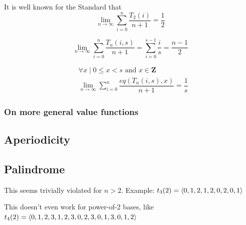 \documentclass[conference]{IEEEtran}
\begin{document}
It is well known \cite{Cai_2020} for the Standard \TMS that
\begin{equation}
    \lim_{n\to\infty} \sum_{i=0}^n \dfrac{T_{2}(i)}{n+1} = \dfrac{1}{2}
\end{equation}


\begin{equation}
    \lim_{n\to\infty} \sum_{i=0}^n\dfrac{T_{n}(i, s)}{n+1} = \sum_{i=0}^{s-1}\dfrac{i}{s} = \dfrac{n-1}{2}
\end{equation}


\begin{equation}
\begin{aligned}
    &\forall{x} \;|\; 0 \le x < s \text{ and } x \in \mathbf{Z} \\
    &\lim_{n\to\infty} \sum_{i=0}^n\dfrac{eq\left(T_{n}(i, s), x\right)}{n+1} = \dfrac{1}{s}
\end{aligned}
\end{equation}

\subsubsection{On more general value functions}

\subsection{Aperiodicity}


\subsection{Palindrome}

This seems trivially violated for $n > 2$. Example: $t_3(2) = \langle 0, 1, 2, 1, 2, 0, 2, 0, 1 \rangle$

This doesn't even work for power-of-2 bases, like $t_4(2) = \langle 0, 1, 2, 3, 1, 2, 3, 0, 2, 3, 0, 1, 3, 0, 1, 2 \rangle$

\end{document}
